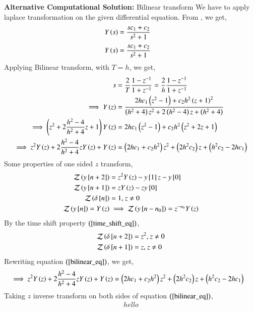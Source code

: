 \documentclass[journal]{IEEEtran}
\begin{document}
\textbf{Alternative Computational Solution:} Bilinear transform 
\newline
We have to apply laplace transformation on the given differential equation. From \brak{\ref{laplace_eq}}, we get,
\begin{align}
    Y\left(s\right) &= \frac{sc_1 + c_2}{s^2 + 1}
\end{align}
\begin{align}
    Y\left(s\right) &= \frac{sc_1 + c_2}{s^2 + 1}
\end{align}
Applying Bilinear transform, with $T = h$, we get,
\begin{align}
    s &= \frac{2}{T}\frac{1 - z^{-1}}{1 + z^{-1}} = \frac{2}{h}\frac{1 - z^{-1}}{1 + z^{-1}}\\
    \implies Y\left(z\right) &= \frac{2hc_1 \left(z^2 - 1\right) + c_2h^2 \left(z + 1\right)^2}{\left(h^2 + 4\right)z^2 + 2\left(h^2 - 4\right)z + \left(h^2 + 4\right)}\\
    \implies \left(z^2 + 2\frac{h^2 - 4}{h^2 + 4}z + 1\right) Y\left(z\right) &= 2hc_1 \left(z^2 - 1\right) + c_2h^2 \left(z^2 + 2z + 1\right)\\
    \implies z^2Y\left(z\right) + 2\frac{h^2 - 4}{h^2 + 4}zY\left(z\right) + Y\left(z\right) &= \left(2h c_1 + c_2 h^2\right)z^2 + \left(2h^2 c_2\right)z + \left(h^2c_2 - 2hc_1\right) \label{bilinear_eq}
\end{align}
Some properties of one sided $z$ transform,
\begin{align}
    \mathcal{Z}\brak{y\sbrak{n + 2}} &= z^2 Y\brak{z} - y\sbrak{1}z - y\sbrak{0}\\
    \mathcal{Z}\brak{y\sbrak{n + 1}} &= z Y\brak{z} - z y_\sbrak{0}\\
    \mathcal{Z}\brak{\delta\sbrak{n}} &= 1 \text{, } z \neq 0\\
    \mathcal{Z}\brak{y\sbrak{n}} = Y\brak{z} &\implies \mathcal{Z}\brak{y\sbrak{n - n_0}} = z^{-n_0}Y\brak{z} \label{time_shift_eq}
\end{align}
By the time shift property $\left(\ref{time_shift_eq}\right)$,
\begin{align}
    \mathcal{Z}\left(\delta{}\left[n + 2\right]\right) &= z^2 \text{, } z \neq 0\\
    \mathcal{Z}\left(\delta{}\left[n + 1\right]\right) &= z \text{, } z \neq 0
\end{align}
Rewriting equation $\left(\ref{bilinear_eq}\right)$, we get,
\begin{align}
    \implies z^2Y\left(z\right) + 2\frac{h^2 - 4}{h^2 + 4}zY\left(z\right) + Y\left(z\right) &= \left(2h c_1 + c_2 h^2\right)z^2 + \left(2h^2 c_2\right)z + \left(h^2c_2 - 2hc_1\right)
\end{align}
Taking $z$ inverse transform on both sides of equation $\left(\ref{bilinear_eq}\right)$,
\begin{align}
    hello
\end{align}
\end{document}
